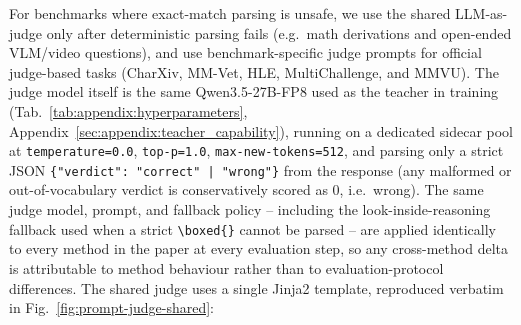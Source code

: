 \documentclass{llmxive}
\begin{document}
For benchmarks where exact-match parsing is unsafe, we use the shared LLM-as-judge only after deterministic parsing fails (e.g.\ math derivations and open-ended VLM/video questions), and use benchmark-specific judge prompts for official judge-based tasks (CharXiv, MM-Vet, HLE, MultiChallenge, and MMVU). The judge model itself is the same Qwen3.5-27B-FP8 used as the teacher in training (Tab.~\ref{tab:appendix:hyperparameters}, Appendix~\ref{sec:appendix:teacher_capability}), running on a dedicated sidecar pool at \texttt{temperature=0.0}, \texttt{top-p=1.0}, \texttt{max-new-tokens=512}, and parsing only a strict JSON \texttt{\{"verdict": "correct"\,|\,"wrong"\}} from the response (any malformed or out-of-vocabulary verdict is conservatively scored as $0$, i.e.\ wrong). The same judge model, prompt, and fallback policy -- including the look-inside-reasoning fallback used when a strict \texttt{\textbackslash boxed\{\}} cannot be parsed -- are applied identically to every method in the paper at every evaluation step, so any cross-method delta is attributable to method behaviour rather than to evaluation-protocol differences. The shared judge uses a single Jinja2 template, reproduced verbatim in Fig.~\ref{fig:prompt-judge-shared}:
\end{document}
